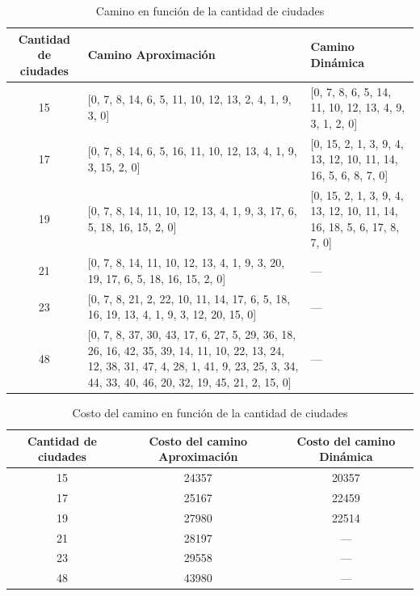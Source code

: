 \documentclass[a4paper,10pt]{article}
\begin{document}
\begin{table}[H]
\centering
\begin{tabular}{| c | p{5cm} | p{5cm} |}
\hline
Cantidad de ciudades & Camino Aproximación & Camino Dinámica \\\hline
15  & [0, 7, 8, 14, 6, 5, 11, 10, 12, 13, 2, 4, 1, 9, 3, 0]	& [0, 7, 8, 6, 5, 14, 11, 10, 12, 13, 4, 9, 3, 1, 2, 0]	\\\hline
17						& [0, 7, 8, 14, 6, 5, 16, 11, 10, 12, 13, 4, 1, 9, 3, 15, 2, 0]	& [0, 15, 2, 1, 3, 9, 4, 13, 12, 10, 11, 14, 16, 5, 6, 8, 7, 0]	\\\hline
19						& [0, 7, 8, 14, 11, 10, 12, 13, 4, 1, 9, 3, 17, 6, 5, 18, 16, 15, 2, 0]			& [0, 15, 2, 1, 3, 9, 4, 13, 12, 10, 11, 14, 16, 18, 5, 6, 17, 8, 7, 0]	\\\hline
21						& [0, 7, 8, 14, 11, 10, 12, 13, 4, 1, 9, 3, 20, 19, 17, 6, 5, 18, 16, 15, 2, 0]	& ---	\\\hline
23						& [0, 7, 8, 21, 2, 22, 10, 11, 14, 17, 6, 5, 18, 16, 19, 13, 4, 1, 9, 3, 12, 20, 15, 0]		& ---	\\\hline
48						& [0, 7, 8, 37, 30, 43, 17, 6, 27, 5, 29, 36, 18, 26, 16, 42, 35, 39, 14, 11, 10, 22, 13, 24, 12, 38, 31, 47, 4, 28, 1, 41, 9, 23, 25, 3, 34, 44, 33, 40, 46, 20, 32, 19, 45, 21, 2, 15, 0]							& ---	\\\hline
\end{tabular}
\caption{Camino en función de la cantidad de ciudades}
\label{tab:held}
\end{table}



\begin{table}[H]
\centering
\begin{tabular}{|c|c|c|}
\hline
Cantidad de ciudades	& Costo del camino Aproximación	& Costo del camino Dinámica \\\hline
15						& 24357							& 20357	\\\hline
17						& 25167							& 22459	\\\hline
19						& 27980							& 22514	\\\hline
21						& 28197							& ---	\\\hline
23						& 29558							& ---	\\\hline
48						& 43980							& ---	\\\hline
\end{tabular}
\caption{Costo del camino en función de la cantidad de ciudades}
\label{tab:held}
\end{table}
\end{document}

